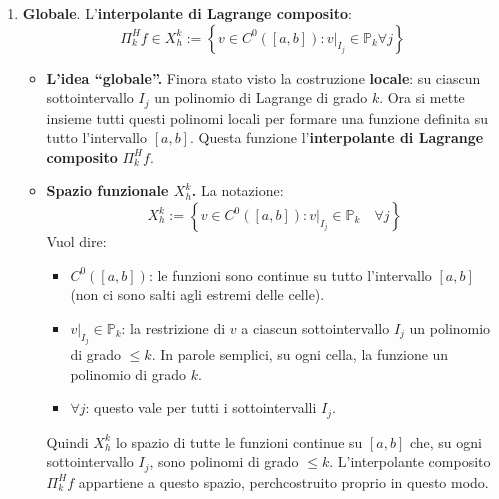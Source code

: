 \begin{itemize}
\begin{takeawaysbox}
\begin{itemize}
\begin{enumerate}
                \item \textbf{Globale}. L'\textbf{interpolante di Lagrange composito}:
                \begin{equation*}
                    \Pi_{k}^{H} f \in X_{h}^{k} := \left\{v \in C^{0}\left(\left[a,b\right]\right) : v|_{I_{j}} \in \mathbb{P}_{k} \forall j\right\}
                \end{equation*}

                \begin{itemize}
                    \item[\textcolor{Green3}{\faIcon{question-circle}}] \textcolor{Green3}{\textbf{L'idea ``globale''.}} Finora \eaccent stato visto la costruzione \textbf{locale}: su ciascun sottointervallo $I_{j}$ un polinomio di Lagrange di grado $k$. Ora si mette insieme tutti questi polinomi locali per formare una funzione definita su tutto l'intervallo $\left[a,b\right]$. Questa funzione \eaccent l'\textbf{interpolante di Lagrange composito} $\Pi_{k}^{H} f$.
                    \item[\textcolor{Green3}{\faIcon{question-circle}}] \textcolor{Green3}{\textbf{Spazio funzionale $X_{h}^{k}$.}} La notazione:
                    \begin{equation*}
                        X_{h}^{k} := \left\{ v \in C^{0}\left(\left[a,b\right]\right) : v|_{I_{j}} \in \mathbb{P}_{k} \quad \forall j \right\}
                    \end{equation*}
                    Vuol dire:
                    \begin{itemize}
                        \item $C^{0}\left(\left[a,b\right]\right)$: le funzioni sono continue su tutto l'intervallo $\left[a,b\right]$ (non ci sono salti agli estremi delle celle).
                        \item $v|_{I_{j}} \in \mathbb{P}_{k}$: la restrizione di $v$ a ciascun sottointervallo $I_{j}$ \eaccent un polinomio di grado $\le k$. In parole semplici, su ogni cella, la funzione \eaccent un polinomio di grado $k$.
                        \item $\forall j$: questo vale per tutti i sottointervalli $I_{j}$.
                    \end{itemize}
                    Quindi $X_{h}^{k}$ \eaccent lo spazio di tutte le funzioni continue su $\left[a,b\right]$ che, su ogni sottointervallo $I_{j}$, sono polinomi di grado $\le k$. L'interpolante composito $\Pi_{k}^{H} f$ appartiene a questo spazio, perch\eaccent costruito proprio in questo modo.

\end{itemize}
\end{enumerate}
\end{itemize}
\end{takeawaysbox}
\end{itemize}
